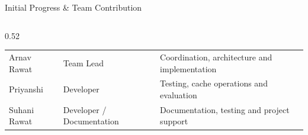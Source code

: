\documentclass[aspectratio=169,10pt]{beamer}
\begin{document}
\begin{frame}{Initial Progress \& Team Contribution}
\begin{columns}[T]
\begin{column}{0.52\textwidth}
\begin{tabularx}{\textwidth}{
    @{}
    >{\raggedright\arraybackslash}p{1.45cm}
    >{\raggedright\arraybackslash}p{1.35cm}
    X
    @{}
}
Arnav Rawat &
Team Lead &
Coordination, architecture and implementation \\

Priyanshi &
Developer &
Testing, cache operations and evaluation \\

Suhani Rawat &
Developer / Documentation &
Documentation, testing and project support \\

\bottomrule

\end{tabularx}

\end{column}

\end{columns}

\end{frame}


\end{document}
